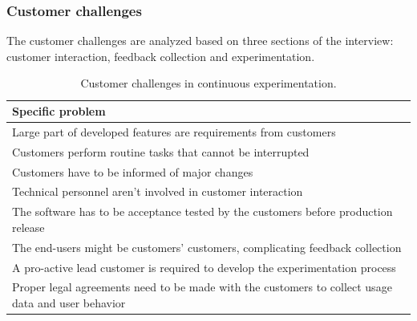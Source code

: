 \documentclass[english]{tktltiki2}
\theoremstyle{definition}
\theoremstyle{remark}
\begin{document}

\subsubsection{Customer challenges}
The customer challenges are analyzed based on three sections of the interview: customer interaction, feedback collection and experimentation.

\begin{center}
\begin{table}[htb]
    \begin{tabular}{ | p{12cm} |}
    \hline
    \textbf{Specific problem} \\ \hline
    Large part of developed features are requirements from customers \\ \hline
	Customers perform routine tasks that cannot be interrupted \\ \hline
	Customers have to be informed of major changes \\ \hline
	Technical personnel aren't involved in customer interaction \\ \hline
	The software has to be acceptance tested by the customers before production release \\ \hline
	The end-users might be customers' customers, complicating feedback collection \\ \hline
	A pro-active lead customer is required to develop the experimentation process \\ \hline
	Proper legal agreements need to be made with the customers to collect usage data and user behavior \\ 
	\hline	
    \end{tabular}
    \caption{Customer challenges in continuous experimentation.}
    \end{table}
\end{center}
\end{document}
